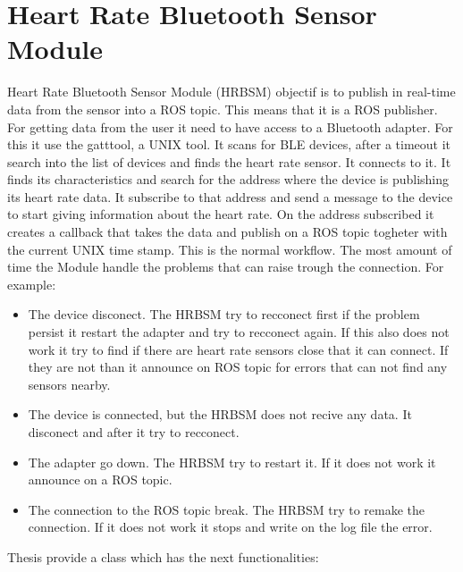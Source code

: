 \section{Heart Rate Bluetooth Sensor Module}
\label{sec:heartmodule}
Heart Rate Bluetooth Sensor Module (HRBSM) objectif is to publish in real-time data from the sensor into a ROS topic. This means
that it is a ROS publisher. For getting data from the user it need to have access to a Bluetooth adapter. For this it use
the gatttool, a UNIX tool. It scans for BLE devices, after a timeout it search into the list of devices and finds the
heart rate sensor. It connects to it. It finds its characteristics and search for the address where the device is publishing
its heart rate data. It subscribe to that address and send a message to the device to start giving information about the
heart rate. On the address subscribed it creates a callback that takes the data and publish on a ROS topic togheter with
the current UNIX time stamp. This is the normal workflow. The most amount of time the Module handle the problems that can raise
trough the connection. For example:
\begin{itemize}
    \item The device disconect. The HRBSM try to recconect first if the problem persist it restart the adapter
    and try to recconect again. If this also does not work it try to find if there are heart rate sensors close that it can connect. If they are not
    than it announce on ROS topic for errors that can not find any sensors nearby.
    \item The device is connected, but the HRBSM does not recive any data. It disconect and after it try to recconect.
    \item The adapter go down. The HRBSM try to restart it. If it does not work it announce on a ROS topic.
    \item The connection to the ROS topic break. The HRBSM try to remake the connection. If it does not work it stops and write on the log file the error.
\end{itemize}
Thesis provide a class which has the next functionalities:
